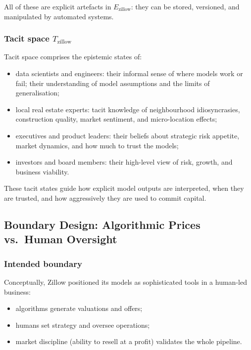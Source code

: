 All of these are explicit artefacts in \(E_{\mathrm{zillow}}\): they can be
stored, versioned, and manipulated by automated systems.

\subsubsection*{Tacit space \(T_{\mathrm{zillow}}\)}

Tacit space comprises the epistemic states of:

\begin{itemize}
  \item data scientists and engineers:
        their informal sense of where models work or fail; their understanding
        of model assumptions and the limits of generalisation;
  \item local real estate experts:
        tacit knowledge of neighbourhood idiosyncrasies, construction quality,
        market sentiment, and micro-location effects;
  \item executives and product leaders:
        their beliefs about strategic risk appetite, market dynamics, and how
        much to trust the models;
  \item investors and board members:
        their high-level view of risk, growth, and business viability.
\end{itemize}

These tacit states guide how explicit model outputs are interpreted, when
they are trusted, and how aggressively they are used to commit capital.

\subsection{Boundary Design: Algorithmic Prices vs.\ Human Oversight}

\subsubsection*{Intended boundary}

Conceptually, Zillow positioned its models as sophisticated tools in a
human-led business:

\begin{itemize}
  \item algorithms generate valuations and offers;
  \item humans set strategy and oversee operations;
  \item market discipline (ability to resell at a profit) validates the
        whole pipeline.
\end{itemize}

